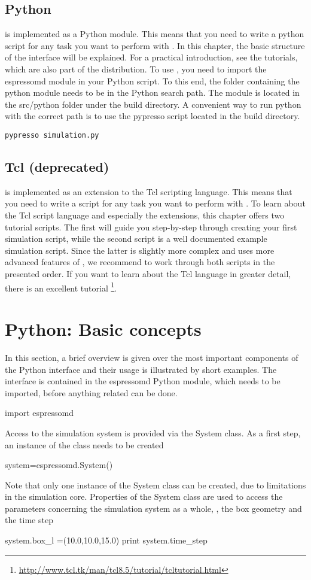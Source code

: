 \subsection{Python}
\es is implemented as a Python module.
This means that you need to write a python script for any task you want to
perform with \es. In this chapter, the basic structure of the interface will be explained. For a practical introduction, see the tutorials, which are also part of the \es distribution.
To use \es, you need to import the espressomd module in your Python script. To this end, the folder containing the python module needs to be in the Python search path. The module is located in the src/python folder under the build directory.
A convenient way to run python with the correct path is to use the pypresso script located in the build directory. 
\begin{verbatim}
pypresso simulation.py
\end{verbatim}



\subsection{Tcl (deprecated)}
\es is implemented as an extension to the Tcl scripting language.
This means that you need to write a script for any task you want to
perform with \es. To learn about the Tcl script language and
especially the \es extensions, this chapter offers two tutorial
scripts. The first will guide you step-by-step through creating your
first simulation script, while the second script is a well documented
example simulation script. Since the latter is slightly more complex
and uses more advanced features of \es, we recommend to work through
both scripts in the presented order.  If you want to learn about the
Tcl language in greater detail, there is an excellent tutorial
\footnote{\url{http://www.tcl.tk/man/tcl8.5/tutorial/tcltutorial.html}}.


\section{Python: Basic concepts}
In this section, a brief overview is given over the most important components of the Python interface and their usage is illustrated by short examples.
The interface is contained in the espressomd Python module, which needs to be imported, before anything \es related can be done.
\begin{pypresso}
import espressomd
\end{pypresso}
Access to the simulation system is provided via the System class. As a first step, an instance of the class needs to be created
\begin{pypresso}
system=espressomd.System()
\end{pypresso}
Note that only one instance of the System class can be created, due to limitations in the simulation core.
Properties of the System class are used to access the parameters concerning the simulation system as a whole, \eg, the box geometry and the time step
\begin{pypresso}
system.box_l =(10.0,10.0,15.0)
print system.time_step
\end{pypresso}

